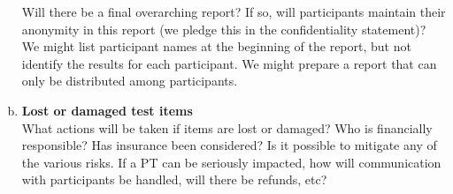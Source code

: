 \begin{enumerate}[a)]
Will there be a final overarching report? If so, will participants maintain their anonymity in this report (we pledge this in the confidentiality statement)? We might list participant names at the beginning of the report, but not identify the results for each participant. We might prepare a report that can only be distributed among participants.

\item	\textbf{Lost or damaged test items} \\
What actions will be taken if items are lost or damaged? Who is financially responsible? Has insurance been considered? Is it possible to mitigate any of the various risks. If a PT can be seriously impacted, how will communication with participants be handled, will there be refunds, etc?

\end{enumerate}

